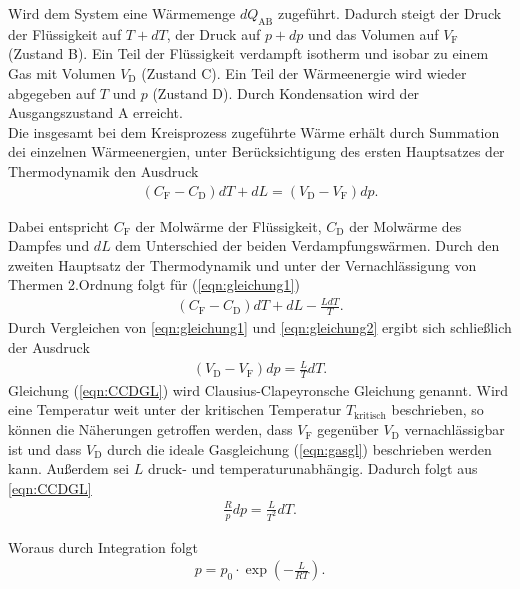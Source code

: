 \noindent
Wird dem System eine Wärmemenge $dQ_{\text{AB}}$ zugeführt. Dadurch steigt der Druck der Flüssigkeit auf $T+dT$, der Druck auf $p+dp$ 
und das Volumen auf  $V_{\text{F}}$ (Zustand B). Ein Teil der Flüssigkeit verdampft isotherm und isobar zu einem Gas mit Volumen 
$V_{\text{D}}$ (Zustand C). Ein Teil der Wärmeenergie wird wieder abgegeben auf $T$ und $p$ (Zustand D). Durch Kondensation wird
der Ausgangszustand A erreicht.
\\

\noindent
Die insgesamt bei dem Kreisprozess zugeführte Wärme erhält durch Summation dei einzelnen Wärmeenergien, unter Berücksichtigung des 
ersten Hauptsatzes der Thermodynamik den Ausdruck 
\begin{align}
    \label{eqn:gleichung1}
    (C_{\text{F}} - C_{\text{D}}) dT + dL = (V_{\text{D}} - V_{\text{F}}) dp.
\end{align}

\noindent
Dabei entspricht $C_{\text{F}}$ der Molwärme der Flüssigkeit, $C_{\text{D}}$ der Molwärme des Dampfes und $dL$ dem Unterschied 
der beiden Verdampfungswärmen. %
Durch den zweiten Hauptsatz der Thermodynamik und unter der Vernachlässigung von Thermen 2.Ordnung folgt für (\autoref{eqn:gleichung1})
\begin{align}
    (C_{\text{F}} - C_{\text{D}}) dT + dL - \frac{LdT}{T}.
    \label{eqn:gleichung2}
\end{align}
Durch Vergleichen von \autoref{eqn:gleichung1} und \autoref{eqn:gleichung2} ergibt sich schließlich der Ausdruck
\begin{align}
    \label{eqn:CCDGL}
    (V_{\text{D}} - V_{\text{F}}) dp = \frac{L}{T} dT.
\end{align}
Gleichung (\ref{eqn:CCDGL}) wird Clausius-Clapeyronsche Gleichung genannt. Wird eine Temperatur weit unter der kritischen Temperatur
$T_{\text{kritisch}}$ beschrieben, so können die Näherungen getroffen werden, dass $V_{\text{F}}$ gegenüber $V_{\text{D}}$ vernachlässigbar
ist und dass $V_{\text{D}}$ durch die ideale Gasgleichung (\ref{eqn:gasgl}) beschrieben werden kann. Außerdem sei $L$ druck- und
temperaturunabhängig. Dadurch folgt aus \autoref{eqn:CCDGL}
\begin{align*}
    \frac{R}{p}dp=\frac{L}{T^2} dT.
\end{align*}

\noindent
Woraus durch Integration folgt
\begin{align}
    \label{eqn:expo}
    p = p_0\cdot \exp(-\frac{L}{RT}).
\end{align}